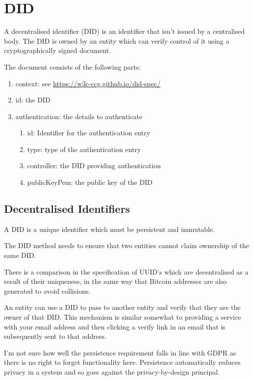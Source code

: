 \documentclass[10pt]{article}
\begin{document}
\section{DID}
A decentralised identifier (DID) is an identifier that isn't issued by a centralised body.  The DID is owned by an entity which can verify control of it using a cryptographically signed document.

The document consists of the following parts:
\begin{enumerate}
	\item context: see \href{DID Specification}{https://w3c-ccg.github.io/did-spec/}
	\item id: the DID
	\item authentication: the details to authenticate
	\begin{enumerate}
		\item id: Identifier for the authentication entry
		\item type: type of the authentication entry
		\item controller: the DID providing authentication
		\item publicKeyPem: the public key of the DID
	\end{enumerate}
	
\end{enumerate}

\subsection{Decentralised Identifiers}
A DID is a unique identifier which must be persistent and immutable.

The DID method needs to ensure that two entities cannot claim ownership of the same DID.

There is a comparison in the specification of UUID's which are decentralised as a result of their uniqueness, in the same way that Bitcoin addresses are also generated to avoid collisions.

An entity can use a DID to pass to another entity and verify that they are the owner of that DID.  This mechanism is similar somewhat to providing a service with your email address and then clicking a verify link in an email that is subsequently sent to that address.

I'm not sure how well the persistence requirement falls in line with GDPR as there is no right to forget functionality here.  Persistence automatically reduces privacy in a system and so goes against the privacy-by-design principal.
\end{document}
